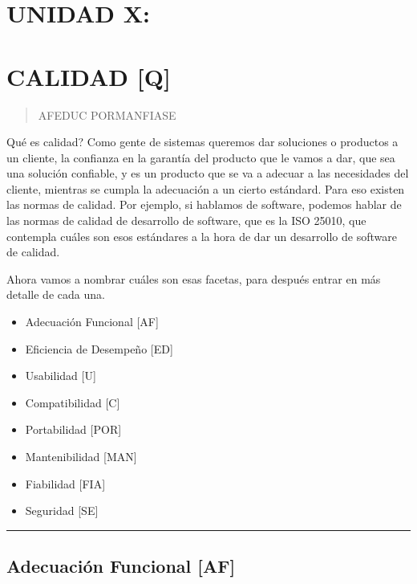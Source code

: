 \hypertarget{unidad-x}{%
\section{UNIDAD X:}\label{unidad-x}}

\hypertarget{calidad-q}{%
\section{CALIDAD {[}Q{]}}\label{calidad-q}}

\begin{quote}
AFEDUC PORMANFIASE
\end{quote}

Qué es calidad? Como gente de sistemas queremos dar soluciones o
productos a un cliente, la confianza en la garantía del producto que le
vamos a dar, que sea una solución confiable, y es un producto que se va
a adecuar a las necesidades del cliente, mientras se cumpla la
adecuación a un cierto estándard. Para eso existen las normas de
calidad. Por ejemplo, si hablamos de software, podemos hablar de las
normas de calidad de desarrollo de software, que es la ISO 25010, que
contempla cuáles son esos estándares a la hora de dar un desarrollo de
software de calidad.

Ahora vamos a nombrar cuáles son esas facetas, para después entrar en
más detalle de cada una.

\begin{itemize}

\item
  Adecuación Funcional {[}AF{]}
\item
  Eficiencia de Desempeño {[}ED{]}
\item
  Usabilidad {[}U{]}
\item
  Compatibilidad {[}C{]}
\item
  Portabilidad {[}POR{]}
\item
  Mantenibilidad {[}MAN{]}
\item
  Fiabilidad {[}FIA{]}
\item
  Seguridad {[}SE{]}
\end{itemize}

\begin{center}\rule{0.5\linewidth}{0.5pt}\end{center}

\hypertarget{adecuaciuxf3n-funcional-af}{%
\subsection{Adecuación Funcional
{[}AF{]}}\label{adecuaciuxf3n-funcional-af}}

